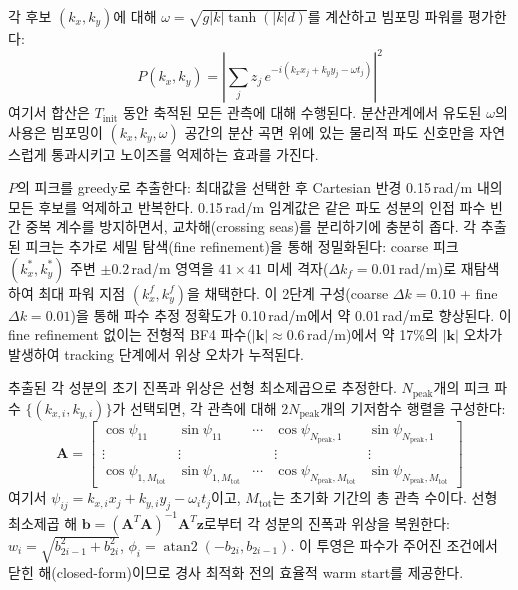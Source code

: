 \documentclass[11pt]{report}
\numberwithin{equation}{chapter}
\numberwithin{figure}{chapter}
\numberwithin{table}{chapter}
\begin{document}
각 후보 $(k_x, k_y)$에 대해 $\omega = \sqrt{g|k|\tanh(|k|d)}$를 계산하고
빔포밍 파워를 평가한다:
\begin{equation}
  P(k_x, k_y) = \left| \sum_{j} z_j \, e^{-i(k_x x_j + k_y y_j - \omega t_j)} \right|^2
\end{equation}
여기서 합산은 $T_\text{init}$ 동안 축적된 모든 관측에 대해 수행된다.
분산관계에서 유도된 $\omega$의 사용은 빔포밍이 $(k_x, k_y, \omega)$ 공간의
분산 곡면 위에 있는 물리적 파도 신호만을 자연스럽게 통과시키고
노이즈를 억제하는 효과를 가진다.

$P$의 피크를 greedy로 추출한다: 최대값을 선택한 후
Cartesian 반경 0.15\,rad/m 내의 모든 후보를 억제하고 반복한다.
0.15\,rad/m 임계값은 같은 파도 성분의 인접 파수 빈 간 중복 계수를 방지하면서,
교차해(crossing seas)를 분리하기에 충분히 좁다.
각 추출된 피크는 추가로 세밀 탐색(fine refinement)을 통해 정밀화된다:
coarse 피크 $(k_x^*, k_y^*)$ 주변 $\pm0.2$\,rad/m 영역을
$41\times41$ 미세 격자($\Delta k_f = 0.01$\,rad/m)로 재탐색하여
최대 파워 지점 $(k_x^f, k_y^f)$을 채택한다.
이 2단계 구성(coarse $\Delta k=0.10$ + fine $\Delta k=0.01$)을 통해
파수 추정 정확도가 0.10\,rad/m에서 약 0.01\,rad/m로 향상된다.
이 fine refinement 없이는 전형적 BF4 파수($|\mathbf{k}|\approx0.6$\,rad/m)에서
약 17\%의 $|\mathbf{k}|$ 오차가 발생하여 tracking 단계에서 위상 오차가 누적된다.

추출된 각 성분의 초기 진폭과 위상은 선형 최소제곱으로 추정한다.
$N_{\text{peak}}$개의 피크 파수 $\{(k_{x,i}, k_{y,i})\}$가 선택되면,
각 관측에 대해 $2N_{\text{peak}}$개의 기저함수 행렬을 구성한다:
\begin{equation}
  \mathbf{A} = \begin{bmatrix}
    \cos\psi_{11} & \sin\psi_{11} & \cdots & \cos\psi_{N_{\text{peak}},1} & \sin\psi_{N_{\text{peak}},1} \\
    \vdots & \vdots & & \vdots & \vdots \\
    \cos\psi_{1,M_{\text{tot}}} & \sin\psi_{1,M_{\text{tot}}} & \cdots & \cos\psi_{N_{\text{peak}},M_{\text{tot}}} & \sin\psi_{N_{\text{peak}},M_{\text{tot}}}
  \end{bmatrix}
\end{equation}
여기서 $\psi_{ij} = k_{x,i}x_j + k_{y,i}y_j - \omega_i t_j$이고,
$M_{\text{tot}}$는 초기화 기간의 총 관측 수이다.
선형 최소제곱 해 $\mathbf{b} = (\mathbf{A}^T\mathbf{A})^{-1}\mathbf{A}^T\mathbf{z}$로부터
각 성분의 진폭과 위상을 복원한다:
$w_i = \sqrt{b_{2i-1}^2 + b_{2i}^2}$,
$\phi_i = \operatorname{atan2}(-b_{2i}, b_{2i-1})$.
이 투영은 파수가 주어진 조건에서 닫힌 해(closed-form)이므로
경사 최적화 전의 효율적 warm start를 제공한다.
\end{document}
